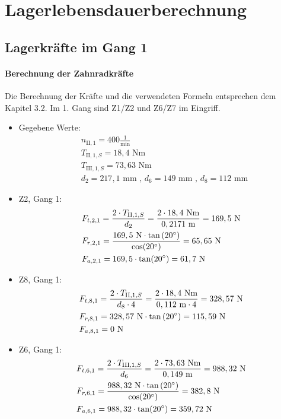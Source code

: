 \newpage
\chapter{Lagerlebensdauerberechnung}
\section{Lagerkräfte im Gang 1}
\subsubsection{Berechnung der Zahnradkräfte}
Die Berechnung der Kräfte und die verwendeten Formeln entsprechen dem Kapitel 3.2. Im 1. Gang sind Z1/Z2 und Z6/Z7 im Eingriff.
\begin{itemize}
\item Gegebene Werte: 
	\begin{align*}
	&n_{\mathrm{II},1} = 400\frac{1}{\text{min}} \\
	&T_{\mathrm{II},1,S} = 18,4\text{ Nm} \\
	&T_{\mathrm{III},1,S} = 73,63\text{ Nm} \\	
	&d_2 = 217,1\text{ mm} \text{ , } d_6 = 149 \text{ mm , } d_8 = 112 \text{ mm}
	\end{align*}
\item Z2, Gang 1:
	\begin{align*} 
	&F_{t,2,1} = \frac{2\cdot T_{\mathrm{II},1,S}}{d_2} = \frac{2 \cdot 18,4 \text{ Nm}}{0,2171 \text{ m}} = 169,5 \text{ N}\\ 
	&F_{r,2,1} = \frac{169,5 \text{ N} \cdot \tan{(20^\circ)}}{\cos(20^\circ)} = 65,65\text{ N}\\ 
	&F_{a,2,1} =169,5 \cdot \tan(20^\circ) =61,7 \text{ N}
	\end{align*}
\item Z8, Gang 1:
	\begin{align*}
	&F_{t,8,1} = \frac{2\cdot T_{\mathrm{II},1,S}}{d_8 \cdot 4} = \frac{2 \cdot 18,4 \text{ Nm}}{0,112 \text{ m} \cdot 4} = 328,57\text{ N}\\ 
	&F_{r,8,1} = 328,57 \text{ N} \cdot \tan{(20^\circ)} = 115,59\text{ N}\\ 
	&F_{a,8,1} =0 \text{ N}
	\end{align*}
\item Z6, Gang 1:
	\begin{align*} 
	&F_{t,6,1} = \frac{2\cdot T_{\mathrm{III},1,S}}{d_6} = \frac{2 \cdot 73,63 \text{ Nm}}{0,149 \text{ m}} = 988,32 \text{ N}\\ 
	&F_{r,6,1} = \frac{988,32 \text{ N} \cdot \tan{(20^\circ)}}{\cos(20^\circ)} = 382,8\text{ N}\\ 
	&F_{a,6,1} =988,32 \cdot \tan(20^\circ) =359,72 \text{ N}
	\end{align*}
\end{itemize}
